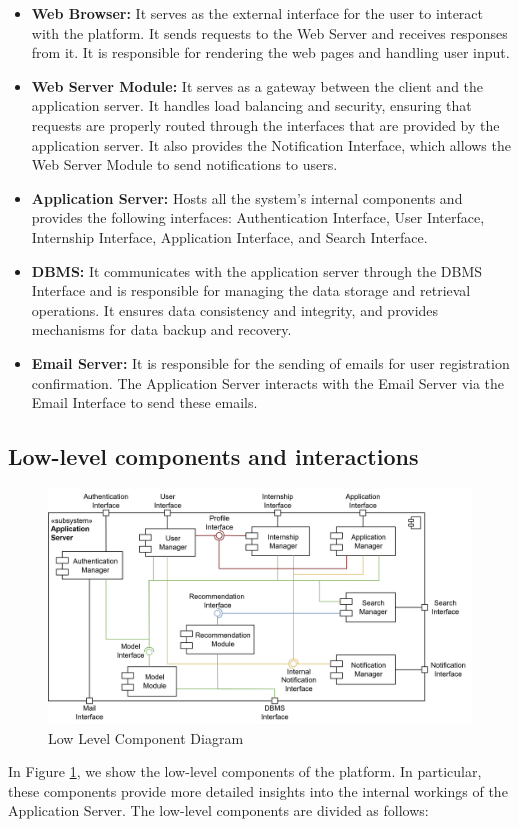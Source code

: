 \begin{itemize}
    \item \textbf{Web Browser:} It serves as the external interface for the user to interact with the platform. It sends requests to the Web Server and
    receives responses from it. It is responsible for rendering the web pages and handling user input.
    \item \textbf{Web Server Module:} It serves as a gateway between the client and the application server. It handles load balancing and security, 
    ensuring that requests are properly routed through the interfaces that are provided by the application server. It also provides the Notification 
    Interface, which allows the Web Server Module to send notifications to users.
    \item \textbf{Application Server:} Hosts all the system's internal components and provides the following interfaces: Authentication Interface, User 
    Interface, Internship Interface, Application Interface, and Search Interface. 
    \item \textbf{DBMS:} It communicates with the application server through the DBMS Interface and is responsible for managing the data storage and 
    retrieval operations. It ensures data consistency and integrity, and provides mechanisms for data backup and recovery. 
    \item \textbf{Email Server:} It is responsible for the sending of emails for user registration confirmation. The Application Server interacts with 
    the Email Server via the Email Interface to send these emails.
\end{itemize}

\subsection{Low-level components and interactions}\label{subsec:low-level components and interactions}
\begin{figure}[H]
    \centering
    \includegraphics[width=1\textwidth]{Images/Components/LL_Component_Diagram.png}
    \caption{Low Level Component Diagram}\label{fig:ll_component_diagram}
\end{figure}
In Figure \ref{fig:ll_component_diagram}, we show the low-level components of the platform. In particular, these components provide more detailed 
insights into the internal workings of the Application Server. The low-level components are divided as follows:
